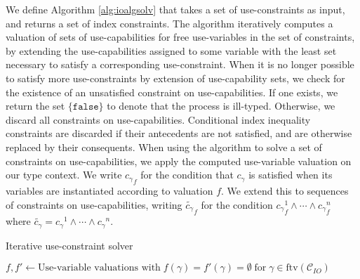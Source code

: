 We define Algorithm \ref{alg:ioalgsolv} that takes a set of use-constraints as input, and returns a set of index constraints. The algorithm iteratively computes a valuation of sets of use-capabilities for free use-variables in the set of constraints, by extending the use-capabilities assigned to some variable with the least set necessary to satisfy a corresponding use-constraint. When it is no longer possible to satisfy more use-constraints by extension of use-capability sets, we check for the existence of an unsatisfied constraint on use-capabilities. If one exists, we return the set $\{\texttt{false}\}$ to denote that the process is ill-typed. Otherwise, we discard all constraints on use-capabilities. Conditional index inequality constraints are discarded if their antecedents are not satisfied, and are otherwise replaced by their consequents. When using the algorithm to solve a set of constraints on use-capabilities, we apply the computed use-variable valuation on our type context. We write ${c_\gamma}_f$ for the condition that $c_\gamma$ is satisfied when its variables are instantiated according to valuation $f$. We extend this to sequences of constraints on use-capabilities, writing $\widetilde{c_\gamma}_f$ for the condition ${c_\gamma}^1_f\land\cdots\land {c_\gamma}^n_f$ where $\widetilde{c_\gamma} = {c_\gamma}^1\land\cdots\land {c_\gamma}^n$.
%
%
\begin{algorithm}
\caption{Iterative use-constraint solver}\label{alg:ioalgsolv}
$f,f' \gets \text{Use-variable valuations with}\;f(\gamma)=f'(\gamma)=\emptyset\;\text{for}\;\gamma\in\text{ftv}(\mathcal{C}_{IO})$\;
%
\end{algorithm}
%



